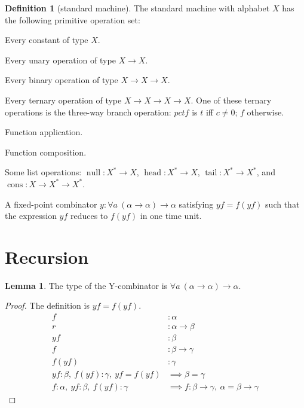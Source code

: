 \documentclass[10pt,statementpaper]{memoir}
\theoremstyle{definition}
\newcounter{thmctr}
\newtheorem{mdef}[thmctr]{Definition}
\newtheorem{mlem}[thmctr]{Lemma}
\newcommand\fnull{\ensuremath{\operatorname{null}}}
\newcommand\fhead{\ensuremath{\operatorname{head}}}
\newcommand\ftail{\ensuremath{\operatorname{tail}}}
\newcommand\fcons{\ensuremath{\operatorname{cons}}}
\begin{document}
\begin{mdef}[standard machine]
    The standard machine with alphabet $X$
    has the following primitive operation set:
    
    Every constant of type $X$.

    Every unary operation of type $X \to X$.

    Every binary operation of type $X \to X \to X$.

    Every ternary operation of type $X \to X \to X \to X$.
    One of these ternary operations is the three-way branch operation:
    $pctf$ is $t$ iff $c \neq 0$; $f$ otherwise.

    Function application.

    Function composition.

    Some list operations: $\fnull : X^* \to X$,
    $\fhead : X^* \to X$,
    $\ftail : X^* \to X^*$,
    and $\fcons : X \to X^* \to X^*$.

    A fixed-point combinator $y : \forall a ~ (\alpha \to \alpha) \to \alpha$ satisfying $yf = f(yf)$
    such that the expression $yf$ reduces to $f(yf)$ in one time unit.
\end{mdef}

\section{Recursion}

\begin{mlem}
    The type of the Y-combinator is $\forall a ~ (\alpha \to \alpha) \to \alpha$.
    \begin{proof}
        The definition is $yf = f(yf)$.
        \begin{align}
            f &: \alpha
            \\
            r &: \alpha \to \beta
            \\
            yf &: \beta
            \\
            f &: \beta \to \gamma
            \\
            f(yf) &: \gamma
            \\
            yf : \beta, \ f(yf) : \gamma, \ yf = f(yf) &\implies \beta = \gamma
            \\
            f : \alpha, \ yf : \beta, \ f(yf) : \gamma &\implies f : \beta \to \gamma, \ \alpha = \beta \to \gamma
        \end{align}
    \end{proof}
\end{mlem}
\end{document}
